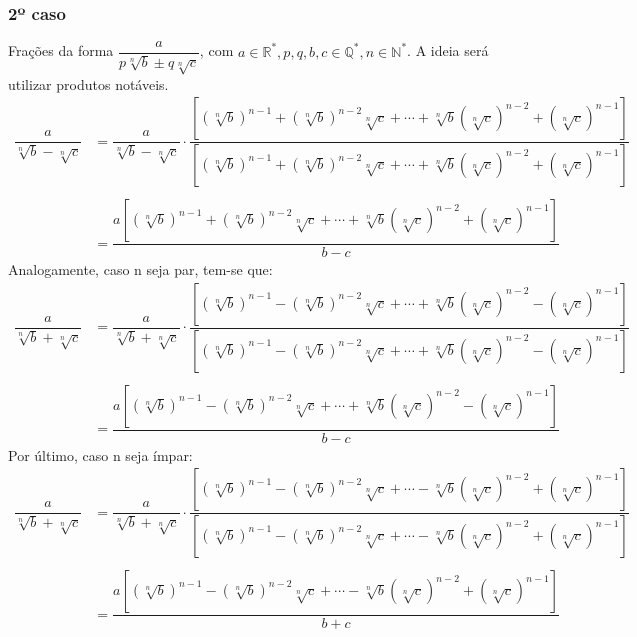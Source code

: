 \documentclass{article}
\begin{document}
\subsubsection{2º caso}
Frações da forma $\dfrac{a}{p\sqrt[n]{b}\pm q\sqrt[n]{c}}$, com $a\in\mathbb{R^*},p,q,b,c\in\mathbb{Q^*},n\in\mathbb{N^*}$. A ideia será utilizar produtos notáveis.
\begin{equation*}
    \begin{aligned}
        \dfrac{a}{\sqrt[n]{b}-\sqrt[n]{c}}&=\dfrac{a}{\sqrt[n]{b}-\sqrt[n]{c}}\cdot\dfrac{[(\sqrt[n]{b})^{n-1}+(\sqrt[n]{b})^{n-2}\sqrt[n]{c}+\cdots+\sqrt[n]{b}(\sqrt[n]{c})^{n-2}+(\sqrt[n]{c})^{n-1}]}{[(\sqrt[n]{b})^{n-1}+(\sqrt[n]{b})^{n-2}\sqrt[n]{c}+\cdots+\sqrt[n]{b}(\sqrt[n]{c})^{n-2}+(\sqrt[n]{c})^{n-1}]}\\\\
        &=\dfrac{a[(\sqrt[n]{b})^{n-1}+(\sqrt[n]{b})^{n-2}\sqrt[n]{c}+\cdots+\sqrt[n]{b}(\sqrt[n]{c})^{n-2}+(\sqrt[n]{c})^{n-1}]}{b-c}
    \end{aligned}
\end{equation*}
Analogamente, caso n seja par, tem-se que:
\begin{equation*}
    \begin{aligned}
        \dfrac{a}{\sqrt[n]{b}+\sqrt[n]{c}}&=\dfrac{a}{\sqrt[n]{b}+\sqrt[n]{c}}\cdot\dfrac{[(\sqrt[n]{b})^{n-1}-(\sqrt[n]{b})^{n-2}\sqrt[n]{c}+\cdots+\sqrt[n]{b}(\sqrt[n]{c})^{n-2}-(\sqrt[n]{c})^{n-1}]}{[(\sqrt[n]{b})^{n-1}-(\sqrt[n]{b})^{n-2}\sqrt[n]{c}+\cdots+\sqrt[n]{b}(\sqrt[n]{c})^{n-2}-(\sqrt[n]{c})^{n-1}]}\\\\
        &=\dfrac{a[(\sqrt[n]{b})^{n-1}-(\sqrt[n]{b})^{n-2}\sqrt[n]{c}+\cdots+\sqrt[n]{b}(\sqrt[n]{c})^{n-2}-(\sqrt[n]{c})^{n-1}]}{b-c}
    \end{aligned}
\end{equation*}
Por último, caso n seja ímpar:
\begin{equation*}
    \begin{aligned}
        \dfrac{a}{\sqrt[n]{b}+\sqrt[n]{c}}&=\dfrac{a}{\sqrt[n]{b}+\sqrt[n]{c}}\cdot\dfrac{[(\sqrt[n]{b})^{n-1}-(\sqrt[n]{b})^{n-2}\sqrt[n]{c}+\cdots-\sqrt[n]{b}(\sqrt[n]{c})^{n-2}+(\sqrt[n]{c})^{n-1}]}{[(\sqrt[n]{b})^{n-1}-(\sqrt[n]{b})^{n-2}\sqrt[n]{c}+\cdots-\sqrt[n]{b}(\sqrt[n]{c})^{n-2}+(\sqrt[n]{c})^{n-1}]}\\\\
        &=\dfrac{a[(\sqrt[n]{b})^{n-1}-(\sqrt[n]{b})^{n-2}\sqrt[n]{c}+\cdots-\sqrt[n]{b}(\sqrt[n]{c})^{n-2}+(\sqrt[n]{c})^{n-1}]}{b+c}
    \end{aligned}
\end{equation*}
\end{document}
